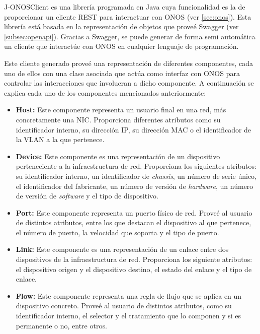 J-ONOSClient\cite{onosjavadocbib} es una librería programada en Java cuya funcionalidad es la de proporcionar un cliente \ac{REST} para interactuar con \ac{ONOS} (ver \ref{sec:onos}). Esta librería está basada en la representación de objetos que proveé Swagger (ver \ref{subsec:openapi}). Gracias a Swagger, se puede generar de forma semi automática un cliente que interactúe con \ac{ONOS} en cualquier lenguaje de programación.

Este cliente generado proveé una representación de diferentes componentes, cada uno de ellos con una clase asociada que actúa como interfaz con \ac{ONOS} para controlar las interacciones que involucran a dicho componente. A continuación se explica cada uno de los componentes mencionados anteriormente:

\begin{itemize}
	
	\item \textbf{Host:} Este componente representa un usuario final en una red, más concretamente una \ac{NIC}. Proporciona diferentes atributos como su identificador interno, su dirección \ac{IP}, su dirección \ac{MAC} o el identificador de la \ac{VLAN} a la que pertenece.
	
	\item \textbf{Device:} Este componente es una representación de un dispositivo perteneciente a la infraestructura de red. Proporciona los siguientes atributos: su identificador interno, un identificador de \textit{chassis}, un número de serie único, el identificador del fabricante, un número de versión de \textit{hardware}, un número de versión de \textit{software} y el tipo de dispositivo. 
	
	\item \textbf{Port:} Este componente representa un puerto físico de red. Proveé al usuario de distintos atributos, entre los que destacan el dispositivo al que pertenece, el número de puerto, la velocidad que soporta y el tipo de puerto.
	
	\item \textbf{Link:} Este componente es una representación de un enlace entre dos dispositivos de la infraestructura de red. Proporciona los siguiente atributos: el dispositivo origen y el dispositivo destino, el estado del enlace y el tipo de enlace.
	
	\item \textbf{Flow:} Este componente representa una regla de flujo que se aplica en un dispositivo concreto. Proveé al usuario de distintos atributos, como su identificador interno, el selector y el tratamiento que lo componen y si es permanente o no, entre otros.
	

\end{itemize}
